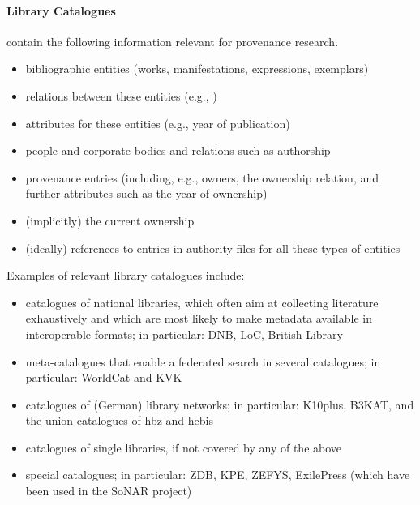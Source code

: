 \paragraph{Library Catalogues}
%
contain the following information relevant for provenance research.
%
\begin{itemize}
  \item
    bibliographic entities (works, manifestations, expressions, exemplars)
  \item
    relations between these entities (e.g., )
  \item
    attributes for these entities (e.g., year of publication)
  \item
    people and corporate bodies and relations such as authorship
  \item
    provenance entries (including, e.g., owners, the ownership relation, and further attributes such as the year of ownership)
  \item
    (implicitly) the current ownership
  \item
    (ideally) references to entries in authority files for all these types of entities
\end{itemize}
%
Examples of relevant library catalogues include:
%
\begin{itemize}
  \item
    catalogues of national libraries, which often aim at collecting literature exhaustively
    and which are most likely to make metadata available in interoperable formats;
    in particular: \gls{DNB}, \gls{LoC}, British Library
  \item
    meta-catalogues that enable a federated search in several catalogues;
    in particular: WorldCat and \gls{KVK}
  \item
    catalogues of (German) library networks;
    in particular: \gls{K10plus}, 
    \gls{B3KAT},
    and the union catalogues of \gls{hbz} and \gls{hebis}
  \item
    catalogues of single libraries, if not covered by any of the above
  \item
    special catalogues;
    in particular: \gls{ZDB}, \gls{KPE}, \gls{ZEFYS}, ExilePress (which have been used in the \gls{SoNAR} project) 
\end{itemize}

